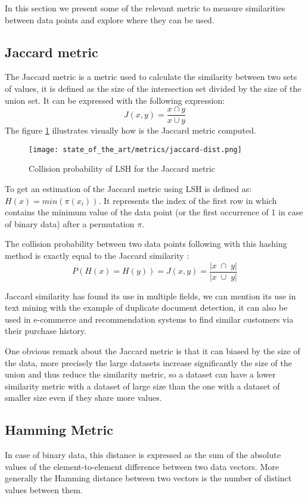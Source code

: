 In this section we present some of the relevant metric to measure similarities
between data points and explore where they can be used.

\subsection{Jaccard metric}
\label{subsect:jaccard_metric}
The Jaccard metric is a metric used to calculate the similarity between two sets
of values, it is defined as the size of the intersection set divided by the size
of the union set. It can be expressed with the following expression:
$$
    J(x, y) = \frac{x \cap y}{x \cup y}
$$
The figure \ref{fig:jaccard_metric} illustrates visually how is the Jaccard
metric computed.

\begin{figure}[h]
    \centering
    \texttt{[image: state\_of\_the\_art/metrics/jaccard-dist.png]}
    \caption{Collision probability of LSH for the Jaccard metric}
    \label{fig:jaccard_metric}
\end{figure}

To get an estimation of the Jaccard metric using LSH is defined as: $H(x) = min
    ( \pi (x_i) )$. It represents the index of the first row in which contains
the minimum value of the data point (or the first occurrence of 1 in case of
binary data) after a permutation $\pi$.

The collision probability between two data points following with this hashing
method is exactly equal to the Jaccard similarity \citep{yu_yun_2022}:
$$
    P( H(x) = H(y) ) = J(x, y) = \frac{|x\; \cap \;y|}{|x\; \cup \;y|}
$$


Jaccard similarity has found its use in multiple fields, we can mention its use
in text mining with the example of duplicate document detection, it can also be
used in e-commerce and recommendation systems to find similar customers via
their purchase history.

One obvious remark about the Jaccard metric is that it can biased by the size of
the data, more precisely the large datasets increase significantly the size of
the union and thus reduce the similarity metric, so a dataset can have a lower
similarity metric with a dataset of large size than the one with a dataset of
smaller size even if they share more values.


\subsection{Hamming Metric}
\label{subsect:hamming_metric}
In case of binary data, this distance is expressed as the sum of the absolute
values of the element-to-element difference between two data vectors. More
generally the Hamming distance between two vectors is the number of distinct
values between them.

